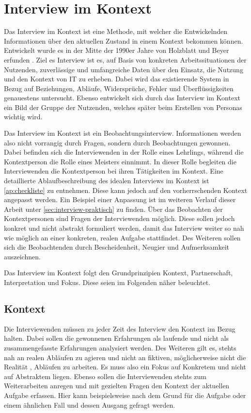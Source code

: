 \section{Interview im Kontext}\label{sec:interview}

Das Interview im Kontext ist eine Methode, mit welcher die Entwickelnden Informationen über den aktuellen Zustand in einem Kontext bekommen können.
Entwickelt wurde es in der Mitte der 1990er Jahre von Holzblatt und Beyer erfunden \cite{InterviewIK}.
Ziel es Interview ist es, auf Basis von konkreten Arbeitssituationen der Nutzenden, zuverlässige und umfangreiche Daten über den Einsatz, die Nutzung und den Kontext von IT zu erheben.
Dabei wird das existierende System in Bezug auf Beziehungen, Abläufe, Widersprüche, Fehler und Überflüssigkeiten genauestens untersucht.
Ebenso entwickelt sich durch das Interview im Kontext ein Bild der Gruppe der Nutzenden, welches später beim Erstellen von Personas wichtig wird.

Das Interview im Kontext ist ein Beobachtungsinterview.
Informationen werden also nicht vorrangig durch Fragen, sondern durch Beobachtungen gewonnen.
Dabei befinden sich die Interviewenden in der Rolle eines Lehrlings, während die Kontextperson die Rolle eines Meisters einnimmt.
In dieser Rolle begleiten die Interviewenden die Kontextperson bei ihren Tätigkeiten im Kontext.
Eine detaillierte Ablaufbeschreibung des idealen Interviews im Kontext ist \autoref{ap:checkliste} zu entnehmen.
Diese kann jedoch auf den vorherrschenden Kontext angepasst werden.
Ein Beispiel einer Anpassung ist im weiteren Verlauf dieser Arbeit unter \autoref{sec:interview-praktisch} zu finden.
Über das Beobachten der Kontextpersonen sind Fragen der Interviewenden möglich.
Diese sollen jedoch konkret und nicht abstrakt formuliert werden, damit das Interview weiter so nah wie möglich an einer konkreten, realen Aufgabe stattfindet.
Des Weiteren sollen sich die Beobachtenden durch Bescheidenheit, Neugier und Aufmerksamkeit auszeichnen.

Das Interview im Kontext folgt den Grundprinzipien Kontext, Partnerschaft, Interpretation und Fokus.
Diese seien im Folgenden näher beleuchtet.

\subsection{Kontext}

Die Interviewenden müssen zu jeder Zeit des Interview den Kontext im Bezug halten.
Dabei sollen die gewonnenen Erfahrungen als laufende und nicht als zusammengefasste Erfahrungen analysiert werden.
Des Weiteren gilt es, stehts nah an realen Abläufen zu agieren und nicht an fiktiven, möglicherweise nicht die Realität , Abläufen zu arbeiten.
Es muss also ein Fokus auf Konkretem und nicht auf Abstraktem liegen.
Ebenso sollen die Interviewenden stehts zum Weiterarbeiten anregen und mit gezielten Fragen den Kontext der aktuellen Aufgabe erfassen.
Hier kann beispielsweise nach dem Grund für die Aufgabe oder einem ähnlichen Fall und dessen Ausgang gefragt werden.

